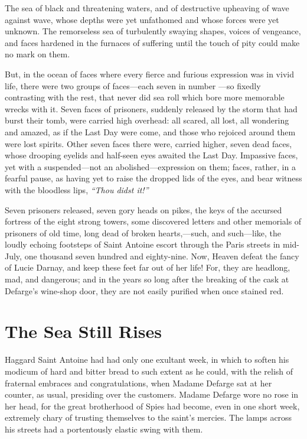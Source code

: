 The sea of black and threatening waters, and of destructive upheaving
of wave against wave, whose depths were yet unfathomed and whose
forces were yet unknown.  The remorseless sea of turbulently swaying
shapes, voices of vengeance, and faces hardened in the furnaces of
suffering until the touch of pity could make no mark on them.

But, in the ocean of faces where every fierce and furious expression
was in vivid life, there were two groups of faces---each seven in number%
---so fixedly contrasting with the rest, that never did sea roll which
bore more memorable wrecks with it.  Seven faces of prisoners, suddenly
released by the storm that had burst their tomb, were carried high
overhead:  all scared, all lost, all wondering and amazed, as if the
Last Day were come, and those who rejoiced around them were lost spirits.
Other seven faces there were, carried higher, seven dead faces, whose
drooping eyelids and half-seen eyes awaited the Last Day.  Impassive
faces, yet with a suspended---not an abolished---expression on them; faces,
rather, in a fearful pause, as having yet to raise the dropped lids of
the eyes, and bear witness with the bloodless lips, \emph{``Thou didst it!''}

Seven prisoners released, seven gory heads on pikes, the keys of the
accursed fortress of the eight strong towers, some discovered letters
and other memorials of prisoners of old time, long dead of broken
hearts,---such, and such---like, the loudly echoing footsteps of Saint
Antoine escort through the Paris streets in mid-July, one thousand seven
hundred and eighty-nine.  Now, Heaven defeat the fancy of Lucie Darnay,
and keep these feet far out of her life!  For, they are headlong, mad,
and dangerous; and in the years so long after the breaking of the cask
at Defarge's wine-shop door, they are not easily purified when once
stained red.



\chapter{The Sea Still Rises}


Haggard Saint Antoine had had only one exultant week, in which to
soften his modicum of hard and bitter bread to such extent as he
could, with the relish of fraternal embraces and congratulations,
when Madame Defarge sat at her counter, as usual, presiding over the
customers. Madame Defarge wore no rose in her head, for the great
brotherhood of Spies had become, even in one short week, extremely
chary of trusting themselves to the saint's mercies.  The lamps across
his streets had a portentously elastic swing with them.

